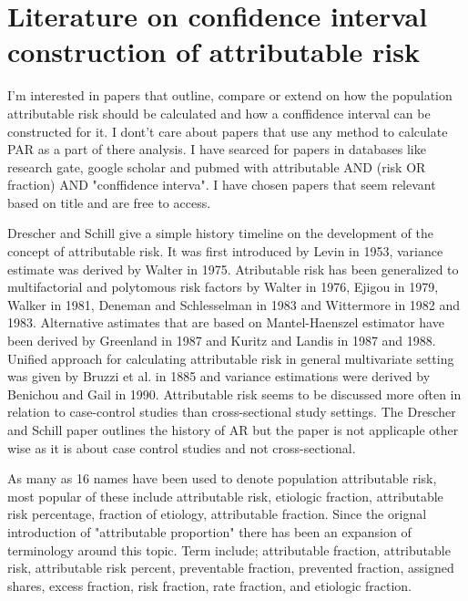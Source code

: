 \chapter{Literature on confidence interval construction of attributable risk}\label{LiteraryReview}

I'm interested in papers that outline, compare or extend on how the population attributable risk should be calculated and how a conffidence interval can be constructed for it. I dont't care about papers that use any method to calculate PAR as a part of there analysis. I have searced for papers in databases like research gate, google scholar and pubmed with attributable AND (risk OR fraction) AND "conffidence interva". I have chosen papers that seem relevant based on title and are free to access.

Drescher and Schill give a simple history timeline on the development of the concept of attributable risk. It was first introduced by Levin in 1953, variance estimate was derived by Walter in 1975. Atributable risk has been generalized to multifactorial and polytomous risk factors by Walter in 1976, Ejigou in 1979, Walker in 1981, Deneman and Schlesselman in 1983 and Wittermore in 1982 and 1983. Alternative astimates that are based on Mantel-Haenszel estimator have been derived by Greenland in 1987 and Kuritz and Landis in 1987 and 1988. Unified approach for calculating attributable risk in general multivariate setting was given by Bruzzi et al. in 1885 and variance estimations were derived by Benichou and Gail in 1990. \cite{Drescher1991AttributableRE} Attributable risk seems to be discussed more often in relation to case-control studies than cross-sectional study settings. \cite{Lui2001NotesOI} The Drescher and Schill paper outlines the history of AR but the paper is not applicaple other wise as it is about case control studies and not cross-sectional.

As many as 16 names have been used to denote population attributable risk, most popular of these include attributable risk, etiologic fraction, attributable risk percentage, fraction of etiology, attributable fraction.\cite{Ahrens2005HandbookOE} Since the orignal introduction of "attributable proportion" there has been an expansion of terminology around this topic. Term include; attributable fraction, attributable risk, attributable risk percent, preventable fraction, prevented fraction, assigned shares, excess fraction, risk fraction, rate fraction, and etiologic fraction. \cite{Greenland2015ConceptsAP}

